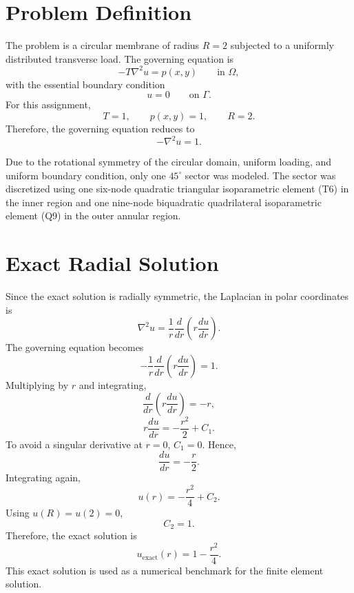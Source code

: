 \documentclass[12pt,a4paper]{article}
\begin{document}
\section{Problem Definition}

The problem is a circular membrane of radius $R=2$ subjected to a uniformly distributed transverse load. The governing equation is
\begin{equation}
    -T\nabla^2 u = p(x,y) \qquad \text{in } \Omega,
\end{equation}
with the essential boundary condition
\begin{equation}
    u=0 \qquad \text{on } \Gamma.
\end{equation}
For this assignment,
\begin{equation}
    T=1, \qquad p(x,y)=1, \qquad R=2.
\end{equation}
Therefore, the governing equation reduces to
\begin{equation}
    -\nabla^2 u = 1.
\end{equation}

Due to the rotational symmetry of the circular domain, uniform loading, and uniform boundary condition, only one $45^\circ$ sector was modeled. The sector was discretized using one six-node quadratic triangular isoparametric element (T6) in the inner region and one nine-node biquadratic quadrilateral isoparametric element (Q9) in the outer annular region.

\section{Exact Radial Solution}

Since the exact solution is radially symmetric, the Laplacian in polar coordinates is
\begin{equation}
    \nabla^2 u = \frac{1}{r}\frac{d}{dr}\left(r\frac{du}{dr}\right).
\end{equation}
The governing equation becomes
\begin{equation}
    -\frac{1}{r}\frac{d}{dr}\left(r\frac{du}{dr}\right)=1.
\end{equation}
Multiplying by $r$ and integrating,
\begin{equation}
    \frac{d}{dr}\left(r\frac{du}{dr}\right)=-r,
\end{equation}
\begin{equation}
    r\frac{du}{dr}=-\frac{r^2}{2}+C_1.
\end{equation}
To avoid a singular derivative at $r=0$, $C_1=0$. Hence,
\begin{equation}
    \frac{du}{dr}=-\frac{r}{2}.
\end{equation}
Integrating again,
\begin{equation}
    u(r)=-\frac{r^2}{4}+C_2.
\end{equation}
Using $u(R)=u(2)=0$,
\begin{equation}
    C_2=1.
\end{equation}
Therefore, the exact solution is
\begin{equation}
    \boxed{u_{\text{exact}}(r)=1-\frac{r^2}{4}}.
\end{equation}
This exact solution is used as a numerical benchmark for the finite element solution.
\end{document}
